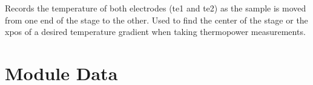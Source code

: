 \documentclass[letterpaper,10pt,english]{sphinxmanual}
\begin{document}

\begin{fulllineitems}
\label{\detokenize{source/laboratory.utils:laboratory.utils.calibrate.furnace_profile}}
Records the temperature of both electrodes (te1 and te2) as the sample is moved
from one end of the stage to the other. Used to find the center of the stage or the xpos of a desired temperature gradient when taking thermopower measurements.

\end{fulllineitems}



\section{Module Data}
\label{\detokenize{source/laboratory.utils:module-laboratory.utils.data}}\label{\detokenize{source/laboratory.utils:module-data}}
\end{document}
